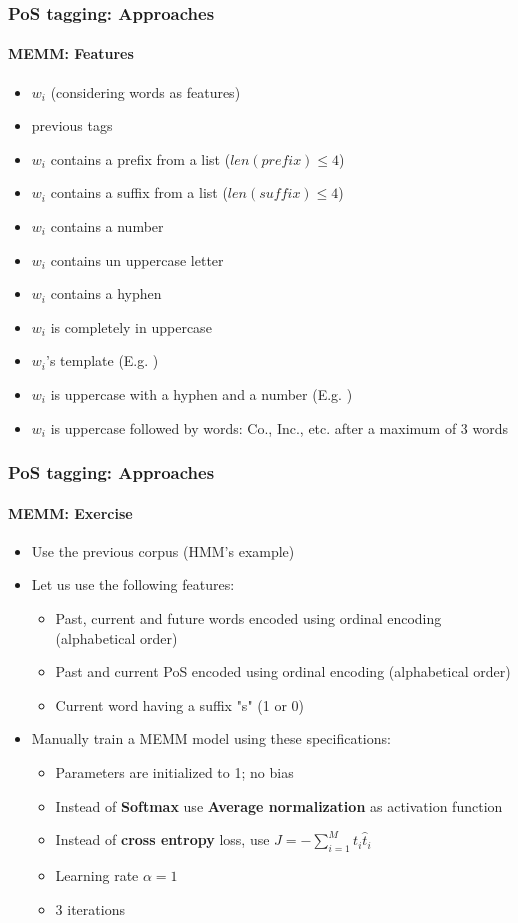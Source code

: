 \documentclass[xcolor=table]{beamer}
\begin{document}
\begin{frame}
\frametitle{PoS tagging: Approaches}
\framesubtitle{MEMM: Features}

\begin{itemize}
	\item $w_i$ (considering words as features)
	\item previous tags 
	\item $w_i$ contains a prefix from a list ($len(prefix) \le 4$) 
	\item $w_i$ contains a suffix from a list  ($len(suffix) \le 4$) 
	\item $w_i$ contains a number 
	\item $w_i$ contains un uppercase letter
	\item $w_i$ contains a hyphen 
	\item $w_i$ is completely in uppercase
	\item $w_i$'s template (E.g. ) 
	\item $w_i$ is uppercase with a hyphen and a number (E.g. ) 
	\item $w_i$ is uppercase followed by words: Co., Inc., etc. after a maximum of 3 words
\end{itemize}

\end{frame}

\begin{frame}
	\frametitle{PoS tagging: Approaches}
	\framesubtitle{MEMM: Exercise}
	
	\begin{itemize}
		\item Use the previous corpus (HMM's example)
		\item Let us use the following features:
		\begin{itemize}
			\item Past, current and future words encoded using ordinal encoding (alphabetical order)
			\item Past and current PoS encoded using ordinal encoding (alphabetical order)
			\item Current word having a suffix "s" (1 or 0)
		\end{itemize}
		\item Manually train a MEMM model using these specifications:
		\begin{itemize}
			\item Parameters are initialized to 1; no bias
			\item Instead of \textbf{Softmax} use \textbf{Average normalization} as activation function
			\item Instead of \textbf{cross entropy} loss, use $J = -\sum_{i=1}^{M} t_i \hat{t}_i$
			\item Learning rate $\alpha=1$ 
			\item 3 iterations
		\end{itemize}
	\end{itemize}
	
\end{frame}
\end{document}
